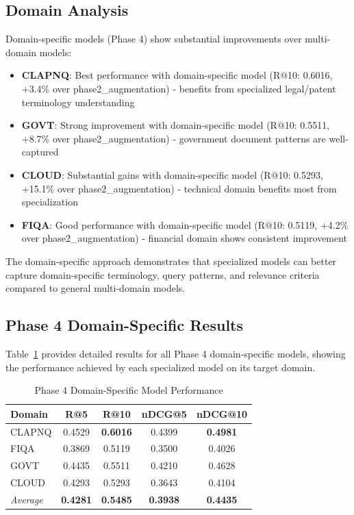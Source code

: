 \documentclass[conference]{IEEEtran}
\begin{document}
\subsection{Domain Analysis}

Domain-specific models (Phase 4) show substantial improvements over multi-domain models:
\begin{itemize}
    \item \textbf{CLAPNQ}: Best performance with domain-specific model (R@10: 0.6016, +3.4\% over phase2\_augmentation) - benefits from specialized legal/patent terminology understanding
    \item \textbf{GOVT}: Strong improvement with domain-specific model (R@10: 0.5511, +8.7\% over phase2\_augmentation) - government document patterns are well-captured
    \item \textbf{CLOUD}: Substantial gains with domain-specific model (R@10: 0.5293, +15.1\% over phase2\_augmentation) - technical domain benefits most from specialization
    \item \textbf{FIQA}: Good performance with domain-specific model (R@10: 0.5119, +4.2\% over phase2\_augmentation) - financial domain shows consistent improvement
\end{itemize}

The domain-specific approach demonstrates that specialized models can better capture domain-specific terminology, query patterns, and relevance criteria compared to general multi-domain models.

\subsection{Phase 4 Domain-Specific Results}

Table~\ref{tab:phase4_domain} provides detailed results for all Phase 4 domain-specific models, showing the performance achieved by each specialized model on its target domain.

\begin{table}[htbp]
\centering
\caption{Phase 4 Domain-Specific Model Performance}
\label{tab:phase4_domain}
\footnotesize
\begin{tabular}{lcccc}
\toprule
\textbf{Domain} & \textbf{R@5} & \textbf{R@10} & \textbf{nDCG@5} & \textbf{nDCG@10} \\
\midrule
CLAPNQ & 0.4529 & \textbf{0.6016} & 0.4399 & \textbf{0.4981} \\
FIQA & 0.3869 & 0.5119 & 0.3500 & 0.4026 \\
GOVT & 0.4435 & 0.5511 & 0.4210 & 0.4628 \\
CLOUD & 0.4293 & 0.5293 & 0.3643 & 0.4104 \\
\midrule
\textit{Average} & \textbf{0.4281} & \textbf{0.5485} & \textbf{0.3938} & \textbf{0.4435} \\
\bottomrule
\end{tabular}
\end{table}
\end{document}
